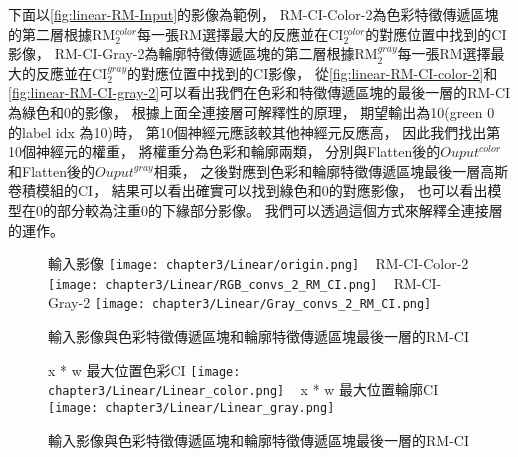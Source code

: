 \documentclass[class=NCU_thesis, crop=false]{standalone}
\begin{document}
下面以\cref{fig:linear-RM-Input}的影像為範例，
RM-CI-Color-2為色彩特徵傳遞區塊的第二層根據RM$^{color}_{2}$每一張RM選擇最大的反應並在CI$^{color}_{2}$的對應位置中找到的CI影像，
RM-CI-Gray-2為輪廓特徵傳遞區塊的第二層根據RM$^{gray}_{2}$每一張RM選擇最大的反應並在CI$^{gray}_{2}$的對應位置中找到的CI影像，
從\cref{fig:linear-RM-CI-color-2}和\cref{fig:linear-RM-CI-gray-2}可以看出我們在色彩和特徵傳遞區塊的最後一層的RM-CI為綠色和0的影像，
根據上面全連接層可解釋性的原理，
期望輸出為10(green 0 的label idx 為10)時，
第10個神經元應該較其他神經元反應高，
因此我們找出第10個神經元的權重，
將權重分為色彩和輪廓兩類，
分別與Flatten後的$Ouput^{color}$和Flatten後的$Ouput^{gray}$相乘，
之後對應到色彩和輪廓特徵傳遞區塊最後一層高斯卷積模組的CI，
結果可以看出確實可以找到綠色和0的對應影像，
也可以看出模型在0的部分較為注重0的下緣部分影像。
我們可以透過這個方式來解釋全連接層的運作。

\begin{figure}[H]
    \centering
    \subcaptionbox
        {輸入影像
        \label{fig:linear-RM-Input}}
        {\texttt{[image: chapter3/Linear/origin.png]}}
    ~
    \subcaptionbox
        {RM-CI-Color-2
        \label{fig:linear-RM-CI-color-2}}
        {\texttt{[image: chapter3/Linear/RGB\_convs\_2\_RM\_CI.png]}}
    ~
    \subcaptionbox
        {RM-CI-Gray-2
        \label{fig:linear-RM-CI-gray-2}}
        {\texttt{[image: chapter3/Linear/Gray\_convs\_2\_RM\_CI.png]}}
    \caption{輸入影像與色彩特徵傳遞區塊和輪廓特徵傳遞區塊最後一層的RM-CI\cite{YangCNNInterpretable}}
    \label{fig:RM-CI}
\end{figure}

\begin{figure}[H]
    \centering
    \subcaptionbox
        {x * w 最大位置色彩CI
        \label{fig:linear-rgb}}
        {\texttt{[image: chapter3/Linear/Linear\_color.png]}}
    ~
    \subcaptionbox
        {x * w 最大位置輪廓CI
        \label{fig:linear-gray}}
        {\texttt{[image: chapter3/Linear/Linear\_gray.png]}}
    \caption{輸入影像與色彩特徵傳遞區塊和輪廓特徵傳遞區塊最後一層的RM-CI\cite{YangCNNInterpretable}}
    \label{fig:Linear-w-x}
\end{figure}
\end{document}
